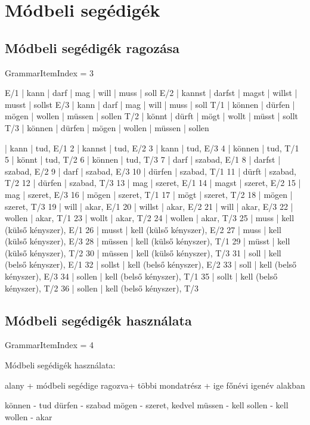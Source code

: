 \documentclass{article}
\newenvironment{desc}{\verbatim}{\endverbatim}
\newenvironment{exmp}{\verbatim}{\endverbatim}
\begin{document}
\section{Módbeli segédigék}

\subsection{Módbeli segédigék ragozása}

GrammarItemIndex = 3

\begin{desc}
E/1 | kann   | darf   | mag   | will   | muss   | soll 
E/2 | kannst | darfst | magst | willst | musst  | sollst 
E/3 | kann   | darf   | mag   | will   | muss   | soll 
T/1 | können | dürfen | mögen | wollen | müssen | sollen 
T/2 | könnt  | dürft  | mögt  | wollt  | müsst  | sollt 
T/3 | können | dürfen | mögen | wollen | müssen | sollen 
\end{desc}

\begin{exmp}
1 | kann | tud, E/1
2 | kannst | tud, E/2
3 | kann | tud, E/3
4 | können | tud, T/1
5 | könnt | tud, T/2
6 | können | tud, T/3
7 | darf | szabad, E/1
8 | darfst | szabad, E/2
9 | darf | szabad, E/3
10 | dürfen | szabad, T/1
11 | dürft | szabad, T/2
12 | dürfen | szabad, T/3
13 | mag | szeret, E/1
14 | magst | szeret, E/2
15 | mag | szeret, E/3
16 | mögen | szeret, T/1
17 | mögt | szeret, T/2
18 | mögen | szeret, T/3
19 | will | akar, E/1
20 | willst | akar, E/2
21 | will | akar, E/3
22 | wollen | akar, T/1
23 | wollt | akar, T/2
24 | wollen | akar, T/3
25 | muss | kell (külső kényszer), E/1
26 | musst | kell (külső kényszer), E/2
27 | muss | kell (külső kényszer), E/3
28 | müssen | kell (külső kényszer), T/1
29 | müsst | kell (külső kényszer), T/2
30 | müssen | kell (külső kényszer), T/3
31 | soll | kell (belső kényszer), E/1
32 | sollst | kell (belső kényszer), E/2
33 | soll | kell (belső kényszer), E/3
34 | sollen | kell (belső kényszer), T/1
35 | sollt | kell (belső kényszer), T/2
36 | sollen | kell (belső kényszer), T/3
\end{exmp}

\subsection{Módbeli segédigék használata}

GrammarItemIndex = 4

\begin{desc}
Módbeli segédigék használata:

alany + módbeli segédige ragozva+ többi mondatrész + ige főnévi igenév alakban 

können - tud
dürfen - szabad
mögen - szeret, kedvel
müssen - kell
sollen - kell
wollen - akar
\end{desc}
\end{document}
